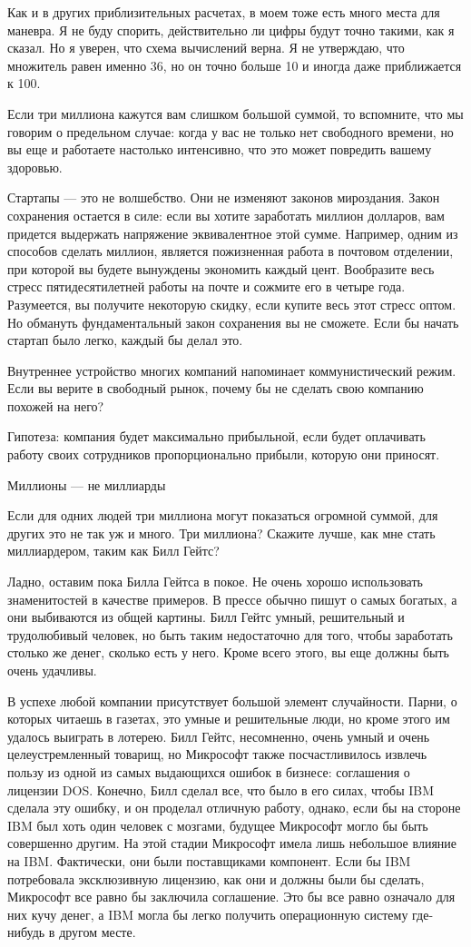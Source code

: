 \documentclass[ebook,12pt,oneside,openany]{memoir}
\begin{document}
Как и в других приблизительных расчетах, в моем тоже есть много места
для маневра. Я не буду спорить, действительно ли цифры будут точно
такими, как я сказал. Но я уверен, что схема вычислений верна. Я не
утверждаю, что множитель равен именно 36, но он точно больше 10 и
иногда даже приближается к 100.

Если три миллиона кажутся вам слишком большой суммой, то вспомните,
что мы говорим о предельном случае: когда у вас не только нет
свободного времени, но вы еще и работаете настолько интенсивно, что
это может повредить вашему здоровью.

Стартапы — это не волшебство. Они не изменяют законов мироздания.
Закон сохранения остается в силе: если вы хотите заработать миллион
долларов, вам придется выдержать напряжение эквивалентное этой сумме.
Например, одним из способов сделать миллион, является пожизненная
работа в почтовом отделении, при которой вы будете вынуждены экономить
каждый цент. Вообразите весь стресс пятидесятилетней работы на почте и
сожмите его в четыре года. Разумеется, вы получите некоторую скидку,
если купите весь этот стресс оптом. Но обмануть фундаментальный закон
сохранения вы не сможете. Если бы начать стартап было легко, каждый бы
делал это.

Внутреннее устройство многих компаний напоминает коммунистический
режим. Если вы верите в свободный рынок, почему бы не сделать свою
компанию похожей на него?

Гипотеза: компания будет максимально прибыльной, если будет оплачивать
работу своих сотрудников пропорционально прибыли, которую они
приносят.

Миллионы — не миллиарды

Если для одних людей три миллиона могут показаться огромной суммой,
для других это не так уж и много. Три миллиона? Скажите лучше, как мне
стать миллиардером, таким как Билл Гейтс?

Ладно, оставим пока Билла Гейтса в покое. Не очень хорошо использовать
знаменитостей в качестве примеров. В прессе обычно пишут о самых
богатых, а они выбиваются из общей картины. Билл Гейтс умный,
решительный и трудолюбивый человек, но быть таким недостаточно для
того, чтобы заработать столько же денег, сколько есть у него. Кроме
всего этого, вы еще должны быть очень удачливы.

В успехе любой компании присутствует большой элемент случайности.
Парни, о которых читаешь в газетах, это умные и решительные люди, но
кроме этого им удалось выиграть в лотерею. Билл Гейтс, несомненно,
очень умный и очень целеустремленный товарищ, но Микрософт также
посчастливилось извлечь пользу из одной из самых выдающихся ошибок в
бизнесе: соглашения о лицензии DOS. Конечно, Билл сделал все, что было
в его силах, чтобы IBM сделала эту ошибку, и он проделал отличную
работу, однако, если бы на стороне IBM был хоть один человек с
мозгами, будущее Микрософт могло бы быть совершенно другим. На этой
стадии Микрософт имела лишь небольшое влияние на IBM. Фактически, они
были поставщиками компонент. Если бы IBM потребовала эксклюзивную
лицензию, как они и должны были бы сделать, Микрософт все равно бы
заключила соглашение. Это бы все равно означало для них кучу денег, а
IBM могла бы легко получить операционную систему где-нибудь в другом
месте.
\end{document}
